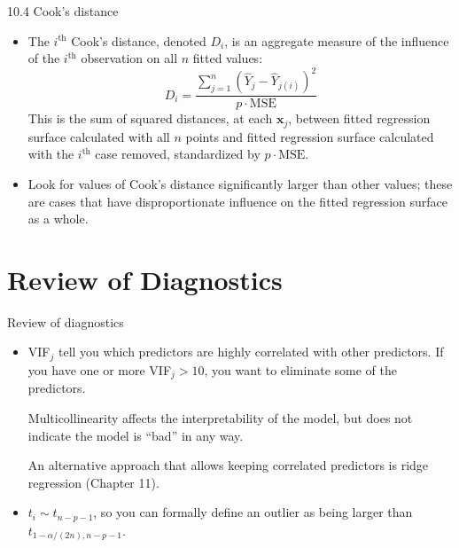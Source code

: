 \documentclass{beamer}
\begin{document}
\begin{frame}{10.4 Cook's distance}
\begin{itemize}
\item The $i^\text{th}$ Cook's distance, denoted $D_i$, is an aggregate measure of the influence of the $i^\text{th}$ observation on all $n$ fitted values:
$$
D_i=\frac{\sum_{j=1}^n(\hat{Y}_j - \hat{Y}_{j(i)})^2}{p\cdot\text{MSE}}
$$
\pause This is the sum of squared distances, at each $\mathbf{x}_j$, between fitted regression surface calculated with all $n$ points and fitted regression surface calculated with the $i^\text{th}$ case removed, standardized by $p\cdot \text{MSE}$.
\item \pause Look for values of Cook's distance significantly larger than other values; these are cases that have disproportionate
influence on the fitted regression surface as a whole.
\end{itemize}
\end{frame}

\section{Review of Diagnostics}

\begin{frame}{Review of diagnostics}
\begin{itemize}
\item {} VIF$_j$ tell you which predictors are highly correlated with other predictors. If you have one or more VIF$_j>10$, you  want to eliminate some of the predictors.
\vspace{10pt}

\pause Multicollinearity affects the interpretability of the model, but does not indicate the model is ``bad'' in any way.
\vspace{10pt}

\pause An alternative approach that allows keeping correlated predictors is ridge regression (Chapter 11).

\item {} $t_i \sim t_{n-p-1}$, so you can formally define an outlier as being larger than $t_{1 - \alpha/(2n), n-p-1}$.
\end{itemize}
\end{frame}
\end{document}
